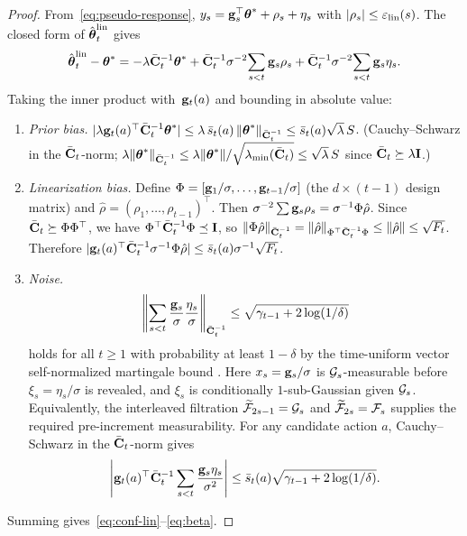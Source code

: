 \begin{proof}
From~\eqref{eq:pseudo-response},
$y_s = \mathbf{g}_s^\top\boldsymbol{\theta}^* + \rho_s + \eta_s$ with
$|\rho_s|\le\varepsilon_{\mathrm{lin}}(s)$.
The closed form of $\hat{\boldsymbol{\theta}}_t^{\mathrm{lin}}$ gives
\[
  \hat{\boldsymbol{\theta}}_t^{\mathrm{lin}} - \boldsymbol{\theta}^*
  = -\lambda\bar{\mathbf{C}}_t^{-1}\boldsymbol{\theta}^*
    + \bar{\mathbf{C}}_t^{-1}\sigma^{-2}\!\sum_{s<t}\mathbf{g}_s\rho_s
    + \bar{\mathbf{C}}_t^{-1}\sigma^{-2}\!\sum_{s<t}\mathbf{g}_s\eta_s.
\]
Taking the inner product with~$\mathbf{g}_t(a)$ and bounding in absolute value:
\begin{enumerate}[nosep,label=(\roman*)]
\item\emph{Prior bias.}\;
$|\lambda\mathbf{g}_t(a)^\top\bar{\mathbf{C}}_t^{-1}\boldsymbol{\theta}^*|
\le \lambda\,\bar s_t(a)\,\|\boldsymbol{\theta}^*\|_{\bar{\mathbf{C}}_t^{-1}}
\le \bar s_t(a)\sqrt{\lambda}\,S$.
(Cauchy--Schwarz in the $\bar{\mathbf{C}}_t$-norm;
$\lambda\|\boldsymbol{\theta}^*\|_{\bar{\mathbf{C}}_t^{-1}}
\le \lambda\|\boldsymbol{\theta}^*\|/\sqrt{\lambda_{\min}(\bar{\mathbf{C}}_t)}
\le \sqrt{\lambda}\,S$
since $\bar{\mathbf{C}}_t\succeq\lambda\mathbf{I}$.)
\item\emph{Linearization bias.}\;
Define $\Phi=[\mathbf{g}_1/\sigma,\dots,\mathbf{g}_{t-1}/\sigma]$ (the $d\times(t{-}1)$
design matrix) and $\hat\rho=(\rho_1,\dots,\rho_{t-1})^\top$.
Then $\sigma^{-2}\sum\mathbf{g}_s\rho_s = \sigma^{-1}\Phi\hat\rho$.
Since $\bar{\mathbf{C}}_t \succeq \Phi\Phi^\top$, we have
$\Phi^\top\bar{\mathbf{C}}_t^{-1}\Phi \preceq \mathbf{I}$, so
$\|\Phi\hat\rho\|_{\bar{\mathbf{C}}_t^{-1}}
= \|\hat\rho\|_{\Phi^\top\bar{\mathbf{C}}_t^{-1}\Phi}
\le \|\hat\rho\| \le \sqrt{F_t}$.
Therefore
$|\mathbf{g}_t(a)^\top\bar{\mathbf{C}}_t^{-1}\sigma^{-1}\Phi\hat\rho|
\le \bar s_t(a)\sigma^{-1}\sqrt{F_t}$.
\item\emph{Noise.}\;
\[
  \left\|
  \sum_{s<t}\frac{\mathbf{g}_s}{\sigma}\frac{\eta_s}{\sigma}
  \right\|_{\bar{\mathbf{C}}_t^{-1}}
  \le
  \sqrt{\gamma_{t-1}+2\log(1/\delta)}
\]
holds for all $t\ge 1$ with probability at least $1-\delta$ by the
time-uniform vector self-normalized martingale bound
\citep{abbasi2011improved}.  Here $x_s=\mathbf{g}_s/\sigma$ is $\mathcal{G}_s$-measurable
before $\xi_s=\eta_s/\sigma$ is revealed, and $\xi_s$ is conditionally
$1$-sub-Gaussian given $\mathcal{G}_s$.  Equivalently, the interleaved filtration
$\widetilde{\mathcal{F}}_{2s-1}=\mathcal{G}_s$ and $\widetilde{\mathcal{F}}_{2s}=\mathcal{F}_s$ supplies the
required pre-increment measurability.  For any candidate action $a$,
Cauchy--Schwarz in the
$\bar{\mathbf{C}}_t$-norm gives
\[
  \left|
  \mathbf{g}_t(a)^\top\bar{\mathbf{C}}_t^{-1}
  \sum_{s<t}\frac{\mathbf{g}_s\eta_s}{\sigma^2}
  \right|
  \le
  \bar s_t(a)\sqrt{\gamma_{t-1}+2\log(1/\delta)} .
\]

\end{enumerate}
Summing gives~\eqref{eq:conf-lin}--\eqref{eq:beta}.
\end{proof}

